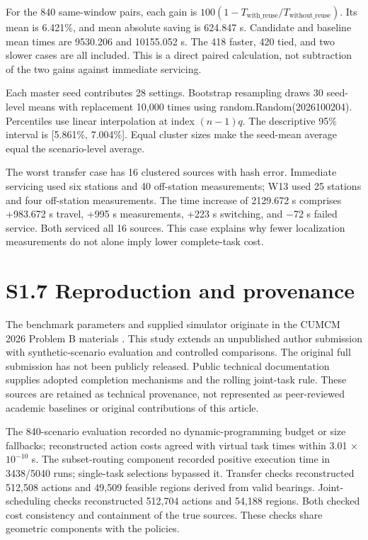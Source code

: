 \documentclass[11pt,letterpaper]{article}
\begin{document}
For the 840 same-window pairs, each gain is $100(1-T_{\mathrm{with\_reuse}}/T_{\mathrm{without\_reuse}})$. Its mean is 6.421\%, and mean absolute saving is 624.847 s. Candidate and baseline mean times are 9530.206 and 10155.052 s. The 418 faster, 420 tied, and two slower cases are all included. This is a direct paired calculation, not subtraction of the two gains against immediate servicing.

Each master seed contributes 28 settings. Bootstrap resampling draws 30 seed-level means with replacement 10,000 times using {\selectfont random.Random(2026100204)}. Percentiles use linear interpolation at index $(n-1)q$. The descriptive 95\% interval is [5.861\%, 7.004\%]. Equal cluster sizes make the seed-mean average equal the scenario-level average.

The worst transfer case has 16 clustered sources with hash error. Immediate servicing used six stations and 40 off-station measurements; W13 used 25 stations and four off-station measurements. The time increase of 2129.672 s comprises +983.672 s travel, +995 s measurements, +223 s switching, and \ensuremath{-}72 s failed service. Both serviced all 16 sources. This case explains why fewer localization measurements do not alone imply lower complete-task cost.

\section*{S1.7 Reproduction and provenance}

The benchmark parameters and supplied simulator originate in the CUMCM 2026 Problem B materials \cite{sref19}. This study extends an unpublished author submission with synthetic-scenario evaluation and controlled comparisons. The original full submission has not been publicly released. Public technical documentation \cite{sref17,sref18} supplies adopted completion mechanisms and the rolling joint-task rule. These sources are retained as technical provenance, not represented as peer-reviewed academic baselines or original contributions of this article.

The 840-scenario evaluation recorded no dynamic-programming budget or size fallbacks; reconstructed action costs agreed with virtual task times within 3.01 \ensuremath{\times} $10^{-10}$ s. The subset-routing component recorded positive execution time in 3438/5040 runs; single-task selections bypassed it. Transfer checks reconstructed 512,508 actions and 49,509 feasible regions derived from valid bearings. Joint-scheduling checks reconstructed 512,704 actions and 54,188 regions. Both checked cost consistency and containment of the true sources. These checks share geometric components with the policies.
\end{document}
